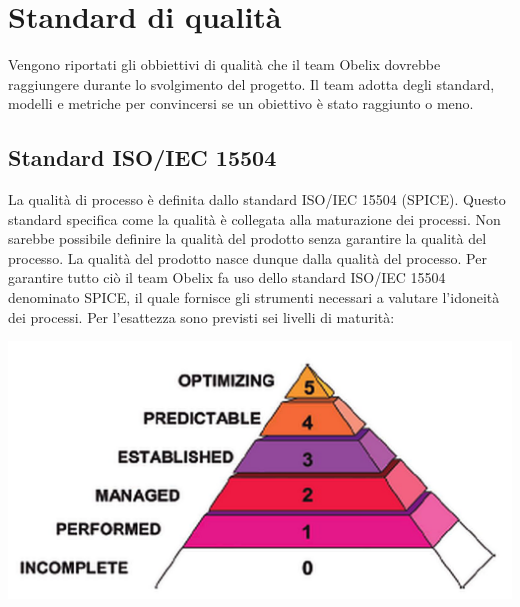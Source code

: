 {\clearpage


\appendix


\section{Standard di qualità}

Vengono riportati gli obbiettivi di qualità che il team Obelix
dovrebbe raggiungere durante lo svolgimento del progetto.  Il team
adotta degli standard, modelli e metriche per convincersi se un
obiettivo è stato raggiunto o meno. 



\subsection{Standard ISO/IEC 15504}


La qualità di processo è definita dallo standard ISO/IEC 15504 (SPICE).
Questo standard specifica come la qualità è collegata alla maturazione dei processi.
Non sarebbe possibile definire la qualità del prodotto senza garantire la
qualità del processo. La qualità del prodotto nasce dunque dalla qualità del
processo. Per garantire tutto ciò il team Obelix fa uso dello standard ISO/IEC
15504 denominato SPICE, il quale fornisce gli strumenti necessari a valutare
l’idoneità dei processi. Per l’esattezza sono previsti sei livelli di maturità:





  \begin{center}
   \includegraphics[scale=1.3]{img/Iso15504.jpg}
\end{center} 



}
